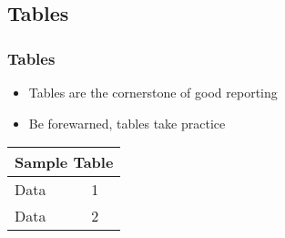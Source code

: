 \documentclass{beamer}
\begin{document}
\subsection{Tables}
\begin{frame}
  \frametitle{Tables}
  \begin{itemize}
  \item Tables are the cornerstone of good reporting
  \item Be forewarned, tables take practice

  \end{itemize}
  \begin{table}
    \centering
    \begin{tabular}{|l|l|}
      \hline
      \multicolumn{2}{|c|}{Sample Table} \\
      \hline
      Data & 1 \\
      Data & 2 \\
      \hline
    \end{tabular}
  \end{table}

\end{frame}
\end{document}
